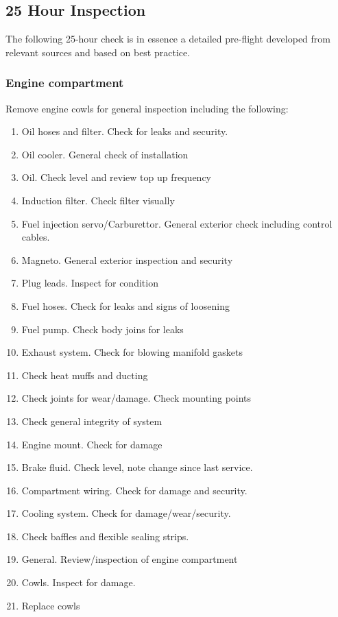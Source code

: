 \subsection{25 Hour Inspection}
The following 25-hour check is in essence a detailed pre-flight developed from relevant sources and based on best practice. 

\subsubsection{Engine compartment}
Remove engine cowls for general inspection including the following: 
\begin{enumerate}
\item Oil hoses and filter. Check for leaks and security.
\item Oil cooler. General check of installation
\item Oil. Check level and review top up frequency
\item Induction filter. Check filter visually
\item Fuel injection servo/Carburettor. General exterior check including control cables.
\item Magneto. General exterior inspection and security
\item Plug leads. Inspect for condition
\item Fuel hoses. Check for leaks and signs of loosening
\item Fuel pump. Check body joins for leaks
\item Exhaust system. Check for blowing manifold gaskets
\item Check heat muffs and ducting
\item Check joints for wear/damage. Check mounting points
\item Check general integrity of system
\item Engine mount. Check for damage
\item Brake fluid. Check level, note change since last service.
\item Compartment wiring. Check for damage and security.
\item Cooling system. Check for damage/wear/security.
\item Check baffles and flexible sealing strips.
\item General. Review/inspection of engine compartment
\item Cowls. Inspect for damage.
\item Replace cowls
\end{enumerate}
